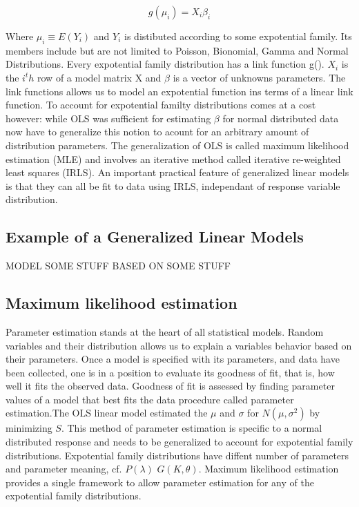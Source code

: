 \documentclass{article}
\begin{document}
        \begin{equation} g(\mu_i) = X_i \beta_i \end{equation}


    Where $\mu_i \equiv E(Y_i)$ and $Y_i$ is distibuted according to some expotential family. Its members include but are not limited to Poisson, Bionomial, Gamma and Normal Distributions. Every expotential family distribution has a link function g(). $X_i$ is the $i^th$ row of a model matrix X and $\beta$ is a vector of unknowns parameters. The link functions allows us to model an expotential function ins terms of a linear link function. To account for expotential familty distributions comes at a cost however: while OLS was sufficient for estimating $\beta$ for normal distributed data now have to generalize this notion to acount for an arbitrary amount of distribution parameters. The generalization of OLS is called maximum likelihood estimation (MLE) and involves an iterative method called iterative re-weighted least squares (IRLS). An important practical feature of generalized linear models is that they can all be fit to data using IRLS, independant of response variable distribution.

    \subsection{Example of a Generalized Linear Models}
    MODEL SOME STUFF BASED ON SOME STUFF
    \subsection{Maximum likelihood estimation}
    Parameter estimation stands at the heart of all statistical models. Random variables and their distribution allows us to explain a variables behavior based on their parameters. Once a model is specified with its parameters, and data have been collected, one is in a position to evaluate its goodness of fit, that is, how well it fits the observed data. Goodness of fit is assessed by finding parameter values of a model that best fits the data procedure called parameter estimation.The OLS linear model estimated the $\mu$ and $\sigma$ for $N( \mu ,\sigma^2)$ by minimizing $S$. This method of parameter estimation is specific to a normal distributed response and needs to be generalized to account for expotential family distributions. Expotential family distributions have diffent number of parameters and parameter meaning, cf.  $P(\lambda)$ $G(K,\theta)$. Maximum likelihood estimation provides a single framework to allow parameter estimation for any of the expotential family distributions.
\end{document}
